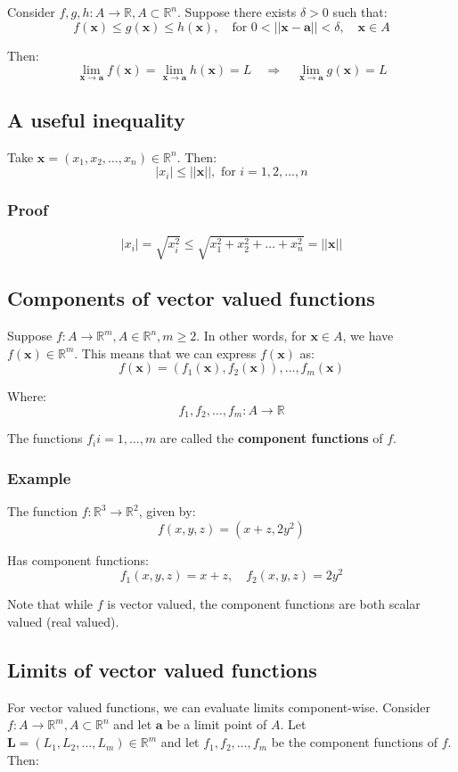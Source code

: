 \documentclass[11pt]{article}
\begin{document}
Consider \(f, g, h : A \rightarrow \mathbb{R}, A \subset \mathbb{R}^n\). Suppose there exists \(\delta > 0\) such that:
\[f(\boldsymbol{x}) \le g(\boldsymbol{x}) \le h(\boldsymbol{x}), \quad \text{for } 0 < ||\boldsymbol{x} - \boldsymbol{a}|| < \delta, \quad \boldsymbol{x} \in A\]

Then:
\[\lim_{\boldsymbol{x} \rightarrow \boldsymbol{a}} f(\boldsymbol{x}) = \lim_{\boldsymbol{x} \rightarrow \boldsymbol{a}} h(\boldsymbol{x}) = L \quad \Rightarrow \quad \lim_{\boldsymbol{x} \rightarrow \boldsymbol{a}} g(\boldsymbol{x}) = L\]
\subsection{A useful inequality}
\label{sec:orgfaf731f}
Take \(\boldsymbol{x} = (x_1, x_2, \ldots, x_n) \in \mathbb{R}^n\). Then:
\[|x_i| \le ||\boldsymbol{x}||, \text{ for } i = 1, 2, \ldots, n\]
\subsubsection{Proof}
\label{sec:org7721b42}
\[|x_i| = \sqrt{x_i^2} \le \sqrt{x_1^2 + x_2^2 + \ldots + x_n^2} = ||\boldsymbol{x}||\]
\subsection{Components of vector valued functions}
\label{sec:org8e28bab}
Suppose \(f : A \rightarrow \mathbb{R}^m, A \in \mathbb{R}^n, m \ge 2\). In other words, for \(\boldsymbol{x} \in A\), we have \(f(\boldsymbol{x}) \in \mathbb{R}^m\). This means that we can express \(f(\boldsymbol{x})\) as:
\[f(\boldsymbol{x}) = (f_1(\boldsymbol{x}), f_2(\boldsymbol{x})), \ldots, f_m(\boldsymbol{x})\]

Where:
\[f_1, f_2, \ldots, f_m : A \rightarrow \mathbb{R}\]

The functions \(f_i i = 1, \ldots, m\) are called the \textbf{component functions} of \(f\).
\subsubsection{Example}
\label{sec:org0b4b116}
The function \(f : \mathbb{R}^3 \rightarrow \mathbb{R}^2\), given by:
\[f(x, y, z) = (x + z, 2y^2)\]

Has component functions:
\[f_1(x, y, z) = x + z, \quad f_2(x, y, z) = 2y^2\]

Note that while \(f\) is vector valued, the component functions are both scalar valued (real valued).
\subsection{Limits of vector valued functions}
\label{sec:org4f58cab}
For vector valued functions, we can evaluate limits component-wise. Consider \(f : A \rightarrow \mathbb{R}^m, A \subset \mathbb{R}^n\) and let \(\boldsymbol{a}\) be a limit point of \(A\). Let \(\boldsymbol{L} = (L_1, L_2, \ldots, L_m) \in \mathbb{R}^m\) and let \(f_1, f_2, \ldots, f_m\) be the component functions of \(f\). Then:
\end{document}

